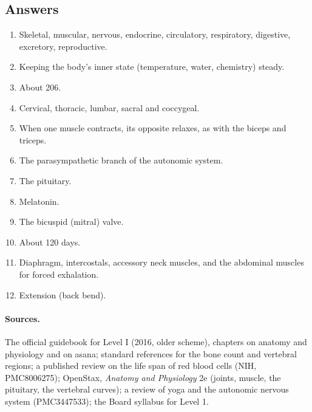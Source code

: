\subsection*{Answers}
\begin{enumerate}
\item Skeletal, muscular, nervous, endocrine, circulatory, respiratory, digestive, excretory, reproductive.
\item Keeping the body's inner state (temperature, water, chemistry) steady.
\item About 206.
\item Cervical, thoracic, lumbar, sacral and coccygeal.
\item When one muscle contracts, its opposite relaxes, as with the biceps and triceps.
\item The parasympathetic branch of the autonomic system.
\item The pituitary.
\item Melatonin.
\item The bicuspid (mitral) valve.
\item About 120 days.
\item Diaphragm, intercostals, accessory neck muscles, and the abdominal muscles for forced exhalation.
\item Extension (back bend).
\end{enumerate}

\paragraph{Sources.} The official guidebook for Level I (2016, older scheme), chapters on anatomy and physiology and on asana; standard references for the bone count and vertebral regions; a published review on the life span of red blood cells (NIH, PMC8006275); OpenStax, \emph{Anatomy and Physiology} 2e (joints, muscle, the pituitary, the vertebral curves); a review of yoga and the autonomic nervous system (PMC3447533); the Board syllabus for Level 1.
